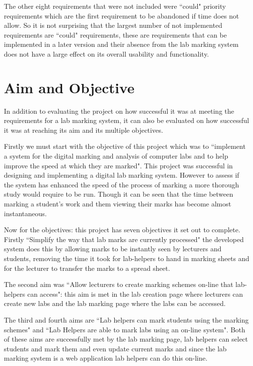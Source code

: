\documentclass[11pt]{report}
\begin{document}
The other eight requirements that were not included were ``could" priority requirements which are the first requirement to be abandoned if time does not allow. So it is not surprising that the largest number of not implemented requirements are ``could" requirements, these are requirements that can be implemented in a later version and their absence from the lab marking system does not have a large effect on its overall usability and functionality.


\section{Aim and Objective}

In addition to evaluating the project on how successful it was at meeting the requirements for a lab marking system, it can also be evaluated on how successful it was at reaching its aim and its multiple objectives.

Firstly we must start with the objective of this project which was to ``implement  a  system  for  the  digital  marking  and analysis of computer labs and to help improve the speed at which they are marked". This project was successful in designing and implementing a digital lab marking system. However to assess if the system has enhanced the speed of the process of marking a more thorough study would require to be run. Though it can be seen that the time between marking a student's work and them viewing their marks has become almost instantaneous.

Now for the objectives: this project has seven objectives it set out to complete. Firstly ``Simplify the way that lab marks are currently processed" the developed system does this by allowing marks to be instantly seen by lecturers and students, removing the time it took for lab-helpers to hand in marking  sheets and for the lecturer to transfer the marks to a spread sheet.

The second aim was ``Allow lecturers to create marking schemes on-line that lab-helpers can access": this aim is met in the lab creation page where lecturers can create new labs and the lab marking page where the labs can be accessed.

The third and fourth aims are ``Lab helpers can mark students using the marking schemes" and ``Lab Helpers are able to mark labs using an on-line system". Both of these aims are successfully met by the lab marking page, lab helpers can select students and mark them and even update current marks and since the lab marking system is a web application lab helpers can do this on-line.
\end{document}
